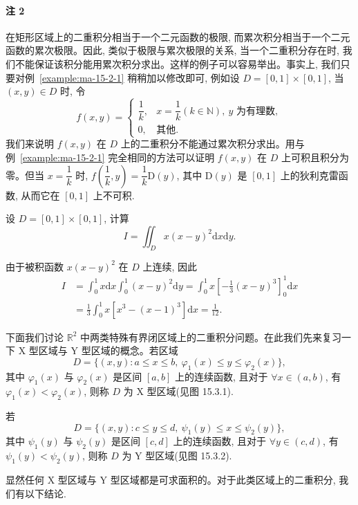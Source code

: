 \paragraph*{注 2}
在矩形区域上的二重积分相当于一个二元函数的极限, 而累次积分相当于一个二元函数的累次极限。因此, 类似于极限与累次极限的关系, 当一个二重积分存在时, 我们不能保证该积分能用累次积分求出。这样的例子可以容易举出。事实上, 我们只要对例~\ref{example:ma-15-2-1} 稍稍加以修改即可, 例如设 $D=[0,1]\times[0,1]$, 当 $(x,y)\in D$ 时, 令
\[
  f(x,y)=
  \begin{cases}
    \dfrac1k, & x=\dfrac1k(k\in\mathbb N),\ y\text{ 为有理数},\\
    0, & \text{其他}.
  \end{cases}
\]
我们来说明 $f(x,y)$ 在 $D$ 上的二重积分不能通过累次积分求出。用与例~\ref{example:ma-15-2-1} 完全相同的方法可以证明 $f(x,y)$ 在 $D$ 上可积且积分为零。但当 $x=\dfrac1k$ 时, $f\left(\dfrac1k,y\right)=\dfrac1k\mathrm D(y)$, 其中 $\mathrm D(y)$ 是 $[0,1]$ 上的狄利克雷函数, 从而它在 $[0,1]$ 上不可积.

\begin{example}\label{example:ma-15-3-1}
设 $D=[0,1]\times[0,1]$, 计算
\[
  I=\iint_D x(x-y)^2\mathrm dx\mathrm dy.
\]
\end{example}


\begin{solve}
由于被积函数 $x(x-y)^2$ 在 $D$ 上连续, 因此
\[
\begin{aligned}
  I
  &=\int_0^1 x\mathrm dx\int_0^1(x-y)^2\mathrm dy
    =\int_0^1 x\left[-\frac13(x-y)^3\right]_0^1\mathrm dx\\
  &=\frac13\int_0^1x[x^3-(x-1)^3]\mathrm dx
    =\frac1{12}.
\end{aligned}
\]

下面我们讨论 $\mathbb R^2$ 中两类特殊有界闭区域上的二重积分问题。在此我们先来复习一下 X 型区域与 Y 型区域的概念。若区域
\[
  D=\{(x,y):a\leqslant x\leqslant b,\ \varphi_1(x)\leqslant y\leqslant\varphi_2(x)\},
\]
其中 $\varphi_1(x)$ 与 $\varphi_2(x)$ 是区间 $[a,b]$ 上的连续函数, 且对于 $\forall x\in(a,b)$, 有 $\varphi_1(x)<\varphi_2(x)$, 则称 $D$ 为 X 型区域(见图 15.3.1).

若
\[
  D=\{(x,y):c\leqslant y\leqslant d,\ \psi_1(y)\leqslant x\leqslant\psi_2(y)\},
\]
其中 $\psi_1(y)$ 与 $\psi_2(y)$ 是区间 $[c,d]$ 上的连续函数, 且对于 $\forall y\in(c,d)$, 有 $\psi_1(y)<\psi_2(y)$, 则称 $D$ 为 Y 型区域(见图 15.3.2).

显然任何 X 型区域与 Y 型区域都是可求面积的。对于此类区域上的二重积分, 我们有以下结论.
\end{solve}


